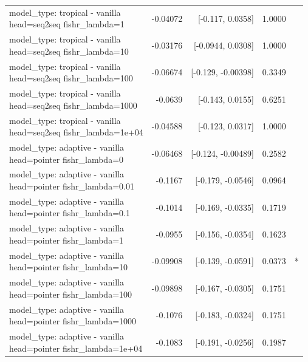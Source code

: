 \documentclass[10pt]{article}
\makeatletter
\newcommand{\stackcell}[1]{\begin{tabular}[t]{@{}l@{}}#1\end{tabular}}
\makeatother
\begin{document}
{\begin{longtable}{lrrrl}
\stackcell{model\_type: tropical - vanilla\\\footnotesize head=seq2seq fishr\_lambda=1 } & -0.04072 & [-0.117, 0.0358] & 1.0000 & \\
\stackcell{model\_type: tropical - vanilla\\\footnotesize head=seq2seq fishr\_lambda=10 } & -0.03176 & [-0.0944, 0.0308] & 1.0000 & \\
\stackcell{model\_type: tropical - vanilla\\\footnotesize head=seq2seq fishr\_lambda=100 } & -0.06674 & [-0.129, -0.00398] & 0.3349 & \\
\stackcell{model\_type: tropical - vanilla\\\footnotesize head=seq2seq fishr\_lambda=1000 } & -0.0639 & [-0.143, 0.0155] & 0.6251 & \\
\stackcell{model\_type: tropical - vanilla\\\footnotesize head=seq2seq fishr\_lambda=1e+04 } & -0.04588 & [-0.123, 0.0317] & 1.0000 & \\
\stackcell{model\_type: adaptive - vanilla\\\footnotesize head=pointer fishr\_lambda=0 } & -0.06468 & [-0.124, -0.00489] & 0.2582 & \\
\stackcell{model\_type: adaptive - vanilla\\\footnotesize head=pointer fishr\_lambda=0.01 } & -0.1167 & [-0.179, -0.0546] & 0.0964 & \\
\stackcell{model\_type: adaptive - vanilla\\\footnotesize head=pointer fishr\_lambda=0.1 } & -0.1014 & [-0.169, -0.0335] & 0.1719 & \\
\stackcell{model\_type: adaptive - vanilla\\\footnotesize head=pointer fishr\_lambda=1 } & -0.0955 & [-0.156, -0.0354] & 0.1623 & \\
\stackcell{model\_type: adaptive - vanilla\\\footnotesize head=pointer fishr\_lambda=10 } & -0.09908 & [-0.139, -0.0591] & 0.0373 & *\\
\stackcell{model\_type: adaptive - vanilla\\\footnotesize head=pointer fishr\_lambda=100 } & -0.09898 & [-0.167, -0.0305] & 0.1751 & \\
\stackcell{model\_type: adaptive - vanilla\\\footnotesize head=pointer fishr\_lambda=1000 } & -0.1076 & [-0.183, -0.0324] & 0.1751 & \\
\stackcell{model\_type: adaptive - vanilla\\\footnotesize head=pointer fishr\_lambda=1e+04 } & -0.1083 & [-0.191, -0.0256] & 0.1987 & \\

\end{longtable}}
\end{document}
